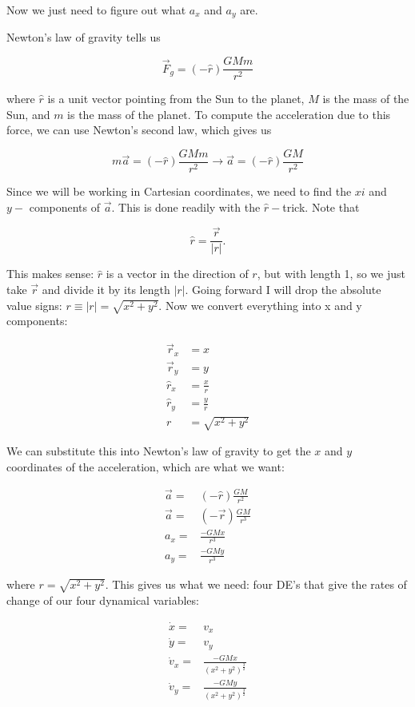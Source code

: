 \documentclass[12ampt]{article}
\begin{document}
Now we just need to figure out what $a_x$ and $a_y$ are.

Newton's law of gravity tells us

\begin{equation}
  \vec F_g = (-\hat r) \frac{GMm}{r^2}
\end{equation}

where $\hat r$ is a unit vector pointing from the Sun to the planet, $M$ is the mass of the Sun, and $m$ is the mass of the planet. To compute the acceleration due to this force, we can use Newton's second law, which gives us

\begin{equation}
  m \vec a = (-\hat r) \frac{GMm}{r^2} \rightarrow \vec a = (-\hat r) \frac{GM}{r^2}
\end{equation}

Since we will be working in Cartesian coordinates, we need to find the $xi$ and $y-$ components of $\vec a$. This is done readily with the $\hat r-$trick. Note that

\begin{equation}
  \hat r = \frac{\vec r}{|r|}.
\end{equation}

This makes sense: $\hat r$ is a vector in the direction of $r$, but with length 1, so we just take $\vec r$ and divide it by its length $|r|$. Going forward I will drop the absolute value signs: $r \equiv |r| = \sqrt{x^2+y^2}$.
Now we convert everything into x and y components:

\begin{align}
  \vec r_x &= x \\
  \vec r_y &= y \\
  \hat r_x &= \frac{x}{r} \\
  \hat r_y &= \frac{y}{r} \\
  r &= \sqrt{x^2+y^2}
\end{align}

We can substitute this into Newton's law of gravity to get the $x$ and $y$ coordinates of the acceleration, which are what we want:

\begin{align}
  \vec a =& (-\hat r) \frac{GM}{r^2} \\
  \vec a =& (-\vec r) \frac{GM}{r^3} \\
  a_x =& \frac{-GMx}{r^3} \\
  a_y =& \frac{-GMy}{r^3}
\end{align}

  where $r=\sqrt{x^2+y^2}$. This gives us what we need: four DE's that give the rates of change of our four dynamical variables:

  \begin{align}
      \dot x =& v_x \\
      \dot y =& v_y \\
    \dot v_x =& \frac{-GMx}{(x^2+y^2)^{\frac{3}{2}}}\\
    \dot v_y =& \frac{-GMy}{(x^2+y^2)^{\frac{3}{2}}}\\
  \end{align}

  
\end{document}
